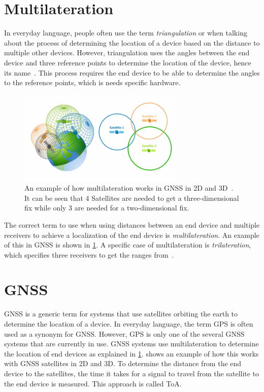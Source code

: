 \section{Multilateration}\label{sec:multilateration-basics}

In everyday language, people often use the term \emph{triangulation} or when talking about the process of determining the location of a device based on the distance to multiple other devices.
However, triangulation uses the angles between the end device and three reference points to determine the location of the device, hence its name~\cite{yaro_multiangulation_2017}.
This process requires the end device to be able to determine the angles to the reference points, which is needs specific hardware.

\begin{figure}[htbp]
    \centering
    \includegraphics[width=0.7\textwidth]{pictures/multilateration/gps_multilateration.png}
    \caption{
        An example of how multilateration works in \ac{GNSS} in 2D and 3D~\protect\cite{gisgeography_how_2018}.
        It can be seen that 4 Satellites are needed to get a three-dimensional fix while only 3 are needed for a two-dimensional fix.
    }\label{pic:multilateration-gps-2d-3d-example}
\end{figure}

The correct term to use when using distances between an end device and multiple receivers to achieve a localization of the end device is \emph{multilateration}.
An example of this in \ac{GNSS} is shown in \cref{pic:multilateration-gps-2d-3d-example}.
A specific case of multilateration is \emph{trilateration}, which specifies three receivers to get the ranges from~\cite{ruiz_efficient_2013}.

\section{\acf{GNSS}}

\ac{GNSS} is a generic term for systems that use satellites orbiting the earth to determine the location of a device.
In everyday language, the term \ac{GPS} is often used as a synonym for \ac{GNSS}.
However, \ac{GPS} is only one of the several \ac{GNSS} systems that are currently in use.
\ac{GNSS} systems use multilateration to determine the location of end devices as explained in \cref{sec:multilateration-basics}.
 shows an example of how this works with \ac{GNSS} satellites in 2D and 3D.
To determine the distance from the end device to the satellites, the time it takes for a signal to travel from the satellite to the end device is measured.
This approach is called \acf{ToA}.

